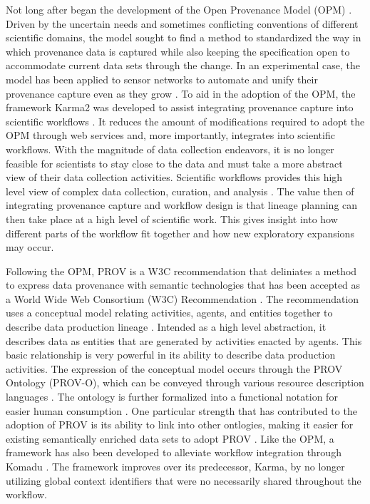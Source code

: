 Not long after began the development of the Open Provenance Model (OPM) \cite{moreau2008open}.
Driven by the uncertain needs and sometimes conflicting conventions of different scientific domains, the model sought to find a method to standardized the way in which provenance data is captured while also keeping the specification open to accommodate current data sets through the change.
In an experimental case, the model has been applied to sensor networks to automate and unify their provenance capture even as they grow \cite{5478496}.
To aid in the adoption of the OPM, the framework Karma2 was developed to assist integrating provenance capture into scientific workflows \cite{simmhan2010karma2}.
It reduces the amount of modifications required to adopt the OPM through web services and, more importantly, integrates into scientific workflows.
With the magnitude of data collection endeavors, it is no longer feasible for scientists to stay close to the data and must take a more abstract view of their data collection activities.
Scientific workflows provides this high level view of complex data collection, curation, and analysis \cite{Casati1996}.
The value then of integrating provenance capture and workflow design is that lineage planning can then take place at a high level of scientific work.
This gives insight into how different parts of the workflow fit together and how new exploratory expansions may occur.

Following the OPM, PROV is a W3C recommendation that deliniates a method to express data provenance with semantic technologies that has been accepted as a World Wide Web Consortium (W3C) Recommendation \cite{Gil2013} \cite{Gil2013a} \cite{Groth2013}.
The recommendation uses a conceptual model relating activities, agents, and entities together to describe data production lineage \cite{Moreau2013c} \cite{Nies2013} \cite{Nies2013a}.
Intended as a high level abstraction, it describes data as entities that are generated by activities enacted by agents.
This basic relationship is very powerful in its ability to describe data production activities.
The expression of the conceptual model occurs through the PROV Ontology (PROV-O), which can be conveyed through various resource description languages \cite{Lebo2013} \cite{Hua2013} \cite{Klyne2013}.
The ontology is further formalized into a functional notation for easier human consumption \cite{Moreau2013b} \cite{Cheney2013a}.
One particular strength that has contributed to the adoption of PROV is its ability to link into other ontlogies, making it easier for existing semantically enriched data sets to adopt PROV \cite{Miles2013} \cite{Moreau2013}.
Like the OPM, a framework has also been developed to alleviate workflow integration through Komadu \cite{Suriarachchi_2015}.
The framework improves over its predecessor, Karma, by no longer utilizing global context identifiers that were no necessarily shared throughout the workflow.

